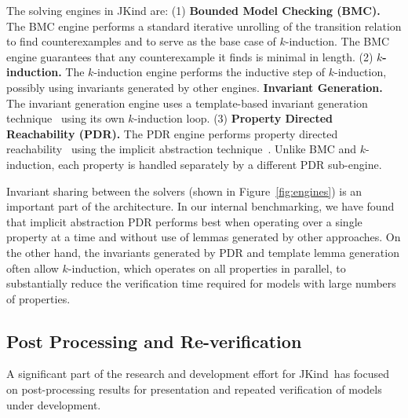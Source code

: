 \documentclass{llncs}
\newcommand{\jkind}{{\sc JKind}\xspace}
\begin{document}
The solving engines in \jkind are:  (1) \textbf{Bounded Model Checking (BMC).} The BMC engine performs a standard iterative unrolling of the transition relation to find counterexamples and to serve as the base case of $k$-induction. The BMC engine guarantees that any counterexample it finds is minimal in length. (2) \textbf{$k$-induction.} The $k$-induction engine performs the inductive step of $k$-induction, possibly using invariants generated by other engines. \textbf{Invariant Generation.} The invariant generation engine uses a template-based invariant generation technique~\cite{kahsai2012nfm} using its own $k$-induction loop. (3) \textbf{Property Directed Reachability (PDR).} The PDR engine performs property directed reachability~\cite{een2011fmcad} using the implicit abstraction technique~\cite{cimatti2014tacas}. Unlike BMC and $k$-induction, each property is handled separately by a different PDR sub-engine. %

Invariant sharing between the solvers (shown in Figure~\ref{fig:engines}) is an important part of the architecture.  In our internal benchmarking, we have found that implicit abstraction PDR performs best when operating over a single property at a time and without use of lemmas generated by other approaches.  On the other hand, the invariants generated by PDR and template lemma generation often allow $k$-induction, which operates on all properties in parallel, to substantially reduce the verification time required for models with large numbers of properties.  %

\subsection{Post Processing and Re-verification}

A significant part of the research and development effort for \jkind\ has focused on
post-processing results for presentation and repeated verification of models under development.

\end{document}
